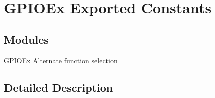 \hypertarget{group___g_p_i_o_ex___exported___constants}{}\section{G\+P\+I\+O\+Ex Exported Constants}
\label{group___g_p_i_o_ex___exported___constants}
\subsection*{Modules}
\begin{DoxyCompactItemize}
\item 
\hyperlink{group___g_p_i_o_ex___alternate__function__selection}{G\+P\+I\+O\+Ex Alternate function selection}
\end{DoxyCompactItemize}


\subsection{Detailed Description}
